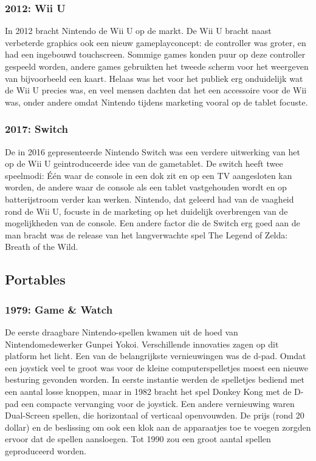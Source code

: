 \documentclass{article}
\begin{document}
\subsubsection{2012: Wii U}
In 2012 bracht Nintendo de Wii U op de markt. De Wii U bracht naast verbeterde graphics ook een nieuw gameplayconcept: de controller was groter, en had een ingebouwd touchscreen. Sommige games konden puur op deze controller gespeeld worden, andere games gebruikten het tweede scherm voor het weergeven van bijvoorbeeld een kaart. Helaas was het voor het publiek erg onduidelijk wat de Wii U precies was, en veel mensen dachten dat het een accessoire voor de Wii was, onder andere omdat Nintendo tijdens marketing vooral op de tablet focuste.

\subsubsection{2017: Switch}
De in 2016 gepresenteerde Nintendo Switch was een verdere uitwerking van het op de Wii U geintroduceerde idee van de gametablet. De switch heeft twee speelmodi: \'E\'en waar de console in een dok zit en op een TV aangesloten kan worden, de andere waar de console als een tablet vastgehouden wordt en op batterijstroom verder kan werken. Nintendo, dat geleerd had van de vaagheid rond de Wii U, focuste in de marketing op het duidelijk overbrengen van de mogelijkheden van de console. Een andere factor die de Switch erg goed aan de man bracht was de release van het langverwachte spel The Legend of Zelda: Breath of the Wild.


\subsection{Portables}
\subsubsection{1979: Game \& Watch}
De eerste draagbare Nintendo-spellen kwamen uit de hoed van Nintendomedewerker Gunpei Yokoi. Verschillende innovaties zagen op dit platform het licht. Een van de belangrijkste vernieuwingen was de d-pad. Omdat een joystick veel te groot was voor de kleine computerspelletjes moest een nieuwe besturing gevonden worden. In eerste instantie werden de spelletjes bediend met een aantal losse knoppen, maar in 1982 bracht het spel Donkey Kong met de D-pad een compacte vervanging voor de joystick. Een andere vernieuwing waren Dual-Screen spellen, die horizontaal of verticaal openvouwden. De prijs (rond 20 dollar) en de beslissing om ook een klok aan de apparaatjes toe te voegen zorgden ervoor dat de spellen aansloegen. Tot 1990 zou een groot aantal spellen geproduceerd worden.
\end{document}
